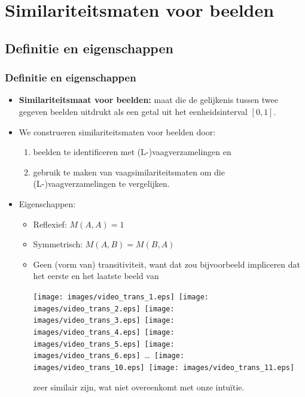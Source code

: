 \documentclass[dutch]{beamer}
\theoremstyle{definition}
\theoremstyle{remark}
\theoremstyle{example}
\begin{document}
\section{Similariteitsmaten voor beelden}
\subsection{Definitie en eigenschappen}
\frame
{
  \frametitle{Definitie en eigenschappen}

  \begin{itemize}
  \item \textbf{Similariteitsmaat voor beelden:} maat die de gelijkenis 
  tussen twee gegeven beelden uitdrukt als een getal uit het eenheidsinterval 
  $[0,1]$.
  \item We construeren similariteitsmaten voor beelden door:
  \begin{enumerate}
    \item beelden te identificeren met (L-)vaagverzamelingen en
    \item gebruik te maken van vaagsimilariteitsmaten om die (L-)vaagverzamelingen
    te vergelijken.
  \end{enumerate}
  \item Eigenschappen:
  \begin{itemize}
  \item Reflexief: $M(A,A)=1$
  \item Symmetrisch: $M(A,B)=M(B,A)$
  \item Geen (vorm van) transitiviteit, want dat zou bijvoorbeeld impliceren dat 
  het eerste en het laatste beeld van
  \begin{center}
  \vspace{5pt}
  \texttt{[image: images/video\_trans\_1.eps]}\ 
  \texttt{[image: images/video\_trans\_2.eps]}\ 
  \texttt{[image: images/video\_trans\_3.eps]}\ 
  \texttt{[image: images/video\_trans\_4.eps]}\ 
  \texttt{[image: images/video\_trans\_5.eps]}\
  \texttt{[image: images/video\_trans\_6.eps]}\
  \ldots\ 
  \texttt{[image: images/video\_trans\_10.eps]}\ 
  \texttt{[image: images/video\_trans\_11.eps]}
  \end{center}
  zeer similair zijn, wat niet overeenkomt met onze intu\"itie.
  \end{itemize}
  \end{itemize}
}
\end{document}
